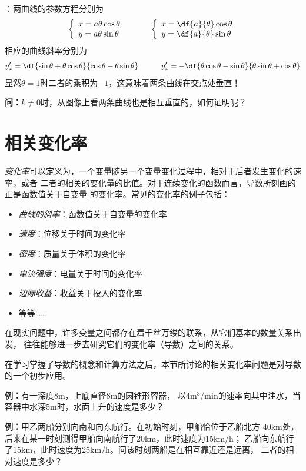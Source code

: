 \begin{shaded}
	[提示]：两曲线的参数方程分别为
	$$
	\left\{\begin{array}{l}
		x=a\theta\cos\theta\\
		y=a\theta\sin\theta
	\end{array}\right.
	\quad\quad\quad
	\left\{\begin{array}{l}
		x=\df{a}{\theta}\cos\theta\\
		y=\df{a}{\theta}\sin\theta
	\end{array}\right.
	$$
	相应的曲线斜率分别为
	$$y'_x=\df{\sin\theta+\theta\cos\theta}{\cos\theta-\theta\sin\theta}
	\quad\quad\quad
	y'_x=-\df{\theta\cos\theta-\sin\theta}{\theta\sin\theta+\cos\theta}
	$$
	显然$\theta=1$时二者的乘积为$-1$，这意味着两条曲线在交点处垂直！
	
	{\bf 问：}$k\ne0$时，从图像上看两条曲线也是相互垂直的，如何证明呢？
\end{shaded}

\section{相关变化率}

{\it 变化率}可以定义为，一个变量随另一个变量变化过程中，相对于后者发生变化的速率，或者
二者的相关的变化量的比值。对于连续变化的函数而言，导数所刻画的正是函数值关于自变量
的变化率。常见的变化率的例子包括：

\begin{itemize}
  \setlength{\itemindent}{1cm}
  \item {\it 曲线的斜率}：函数值关于自变量的变化率 
  \item {\it 速度}：位移关于时间的变化率 
  \item {\it 密度}：质量关于体积的变化率 
  \item {\it 电流强度}：电量关于时间的变化率 
  \item {\it 边际收益}：收益关于投入的变化率 
  \item 等等{\ldots\ldots} 
\end{itemize}

在现实问题中，许多变量之间都存在着千丝万缕的联系，从它们基本的数量关系出发，
往往能够进一步去研究它们的变化率（导数）之间的关系。

在学习掌握了导数的概念和计算方法之后，本节所讨论的相关变化率问题是对导数
的一个初步应用。

{\bf 例：}有一深度$8$m，上底直径$8$m的圆锥形容器，
以$4$m$^3$/min的速率向其中注水，当容器中水深$5$m时，水面上升的速度是多少？

{\bf 例：}甲乙两船分别向南和向东航行。在初始时刻，甲船恰位于乙船北方
$40$km处，后来在某一时刻测得甲船向南航行了20km，此时速度为15km/h；
乙船向东航行了15km，此时速度为25km/h。问该时刻两船是在相互靠近还是远离，
二者的相对速度是多少？

